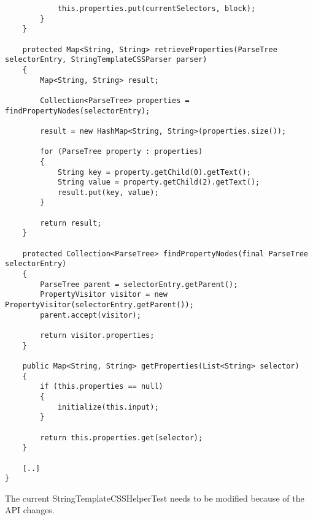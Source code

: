 \documentclass[11pt]{article}
\begin{document}
\begin{verbatim}
            this.properties.put(currentSelectors, block);
        }
    }

    protected Map<String, String> retrieveProperties(ParseTree selectorEntry, StringTemplateCSSParser parser)
    {
        Map<String, String> result;

        Collection<ParseTree> properties = findPropertyNodes(selectorEntry);

        result = new HashMap<String, String>(properties.size());

        for (ParseTree property : properties)
        {
            String key = property.getChild(0).getText();
            String value = property.getChild(2).getText();
            result.put(key, value);
        }

        return result;
    }

    protected Collection<ParseTree> findPropertyNodes(final ParseTree selectorEntry)
    {
        ParseTree parent = selectorEntry.getParent();
        PropertyVisitor visitor = new PropertyVisitor(selectorEntry.getParent());
        parent.accept(visitor);

        return visitor.properties;
    }

    public Map<String, String> getProperties(List<String> selector)
    {
        if (this.properties == null)
        {
            initialize(this.input);
        }

        return this.properties.get(selector);
    }

    [..]
}
\end{verbatim}

The current StringTemplateCSSHelperTest needs to be modified because of the API changes.
\end{document}

